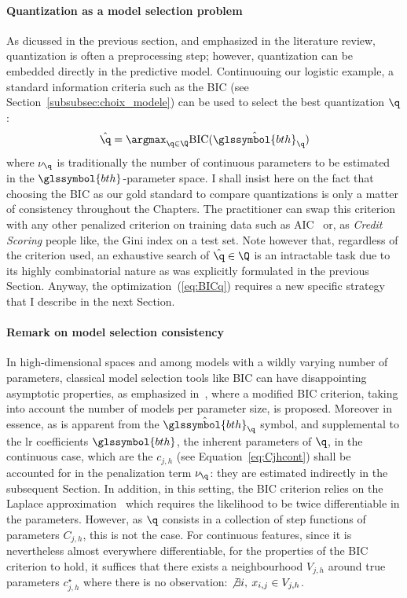\paragraph{Quantization as a model selection problem} \label{par:model_selec}

As dicussed in the previous section, and emphasized in the literature review, quantization is often a preprocessing step; however, quantization can be embedded directly in the predictive model. Continuouing our logistic example, a standard information criteria such as the BIC (see Section~\ref{subsubsec:choix_modele}) can be used to select the best quantization $\q$:
\begin{equation}
    \label{eq:BICq}
    \hat{\q}=\argmax_{\q \in \Q} \text{BIC}(\hat{\glssymbol{bth}}_{\q})
\end{equation}
where $\nu_{\q}$ is traditionally the number of continuous parameters to be estimated in the $\glssymbol{bth}$-parameter space. I shall insist here on the fact that choosing the BIC as our gold standard to compare quantizations is only a matter of consistency throughout the Chapters. The practitioner can swap this criterion with any other penalized criterion on training data such as AIC~\cite{akaike1973information} or, as \textit{Credit Scoring} people like, the Gini index on a test set. Note however that, regardless of the criterion used, an exhaustive search of $\hat{\q}\in\Q$ is an intractable task due to its highly combinatorial nature as was explicitly formulated in the previous Section. Anyway, the optimization~(\ref{eq:BICq}) requires a new specific strategy that I describe in the next Section.

\paragraph{Remark on model selection consistency} \label{par:consistency}

In high-dimensional spaces and among models with a wildly varying number of parameters, classical model selection tools like BIC can have disappointing asymptotic properties, as emphasized in~\cite{chen2008extended}, where a modified BIC criterion, taking into account the number of models per parameter size, is proposed.
Moreover in essence, as is apparent from the $\hat{\glssymbol{bth}}_{\q}$ symbol, and supplemental to the \gls{lr} coefficients $\glssymbol{bth}$, the inherent parameters of $\q$, in the continuous case, which are the $c_{j,h}$ (see Equation~\eqref{eq:Cjhcont}) shall be accounted for in the penalization term $\nu_{\q}$: they are estimated indirectly in the subsequent Section.
In addition, in this setting, the BIC criterion relies on the Laplace approximation~\cite{lebarbier} which requires the likelihood to be twice differentiable in the parameters. However, as $\q$ consists in a collection of step functions of parameters $C_{j,h}$, this is not the case. For continuous features, since it is nevertheless almost everywhere differentiable, for the properties of the BIC criterion to hold, it suffices that there exists a neighbourhood $V_{j,h}$ around true parameters $c_{j,h}^\star$ where there is no observation: $\not\exists i, \: x_{i,j} \in V_{j,h}$.

